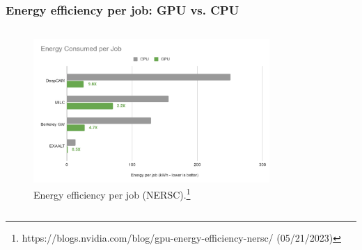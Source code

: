 \begin{frame}
	\frametitle{Energy efficiency per job: GPU vs. CPU}
  \begin{columns}
    \begin{figure}[H]
       \centering
            \includegraphics[width=0.80\textwidth]{./img/NERSC-energy-efficiency-findings.jpg} 
	    \caption{\small{Energy efficiency per job (NERSC).\newline\footnote{https://blogs.nvidia.com/blog/gpu-energy-efficiency-nersc/ (05/21/2023)}}}
     \end{figure}
     \end{columns}
\end{frame}
